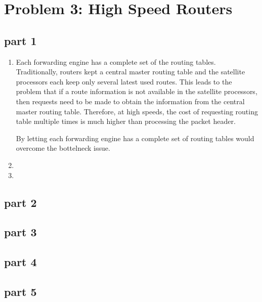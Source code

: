 \section{Problem 3: High Speed Routers}

\subsection{part 1}

\begin{enumerate}
\item Each forwarding engine has a complete set of the routing tables. Traditionally, routers kept a central master routing table and the satellite processors each keep only several latest used routes. This leads to the problem that if a route information is not available in the satellite processors, then requests need to be made to obtain the information from the central master routing table. Therefore, at high speeds, the cost of requesting routing table multiple times is much higher than processing the packet header.

By letting each forwarding engine has a complete set of routing tables would overcome the bottelneck issue.
\item
\item
\end{enumerate}





\subsection{part 2}
\subsection{part 3}
\subsection{part 4}
\subsection{part 5}
